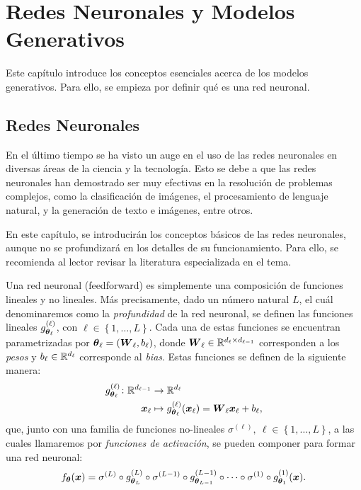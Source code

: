 \chapter{Redes Neuronales y Modelos Generativos}\label{chap:redes-neuronales-y-modelos-generativos}
{
Este capítulo introduce los conceptos esenciales acerca de los modelos generativos. Para ello, se empieza por definir qué es una red neuronal.
\section{Redes Neuronales}\label{sec:redes-Neuronales}
{
En el último tiempo se ha visto un auge en el uso de las redes neuronales en diversas áreas de la ciencia y la tecnología. Esto se debe a que las redes neuronales han demostrado ser muy efectivas en la resolución de problemas complejos, como la clasificación de imágenes, el procesamiento de lenguaje natural, y la generación de texto e imágenes, entre otros.

En este capítulo, se introducirán los conceptos básicos de las redes neuronales, aunque no se profundizará en los detalles de su funcionamiento. Para ello, se recomienda al lector revisar la literatura especializada en el tema.

Una red neuronal (feedforward) es simplemente una composición de funciones lineales y no lineales. Más precisamente, dado un número natural $L$, el cuál denominaremos como la \emph{profundidad} de la red neuronal, se definen las funciones lineales $g^{(\ell)}_{\vb*{\theta}_\ell}$, con $\ell \in \left\{ 1, \ldots, L \right\}$. Cada una de estas funciones se encuentran parametrizadas por $\vb*{\theta}_\ell = (\vb*{W}_\ell, b_\ell)$, donde $\vb*{W}_\ell \in \mathbb{R}^{d_{\ell} \times d_{\ell-1}}$ corresponden a los \emph{pesos} y $b_\ell \in \mathbb{R}^{d_\ell}$ corresponde al \emph{bias}. Estas funciones se definen de la siguiente manera:
\begin{align*}
    g^{(\ell)}_{\vb*{\theta}_\ell} \colon \mathbb{R}^{d_{\ell-1}} & \to \mathbb{R}^{d_\ell}                                                        \\
    \vb*{x}_\ell                                      & \mapsto g^{(\ell)}_{\vb*{\theta}_\ell}(\vb*{x}_\ell) = \vb*{W}_\ell \vb*{x}_\ell + b_\ell,
\end{align*}
que, junto con una familia de funciones no-lineales $\sigma^{(\ell)},\ \ell \in \left\{ 1, \ldots, L \right\}$, a las cuales llamaremos por \emph{funciones de activación}, se pueden componer para formar una red neuronal:
\begin{equation}
    f_{\vb*{\theta}}(\vb*{x}) = \sigma^{(L)} \circ g^{(L)}_{\vb*{\theta}_L} \circ \sigma^{(L-1)} \circ g^{(L-1)}_{\vb*{\theta}_{L-1}} \circ \cdots \circ \sigma^{(1)} \circ g^{(1)}_{\vb*{\theta}_{1}}(\vb*{x}).
\end{equation}

}}
